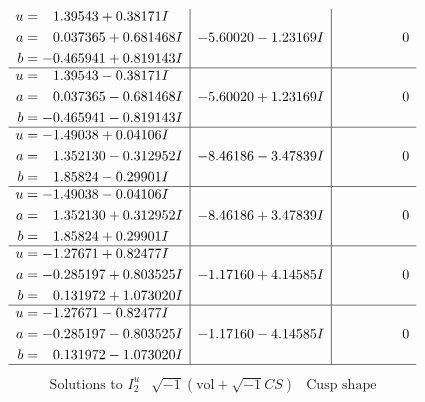 \documentclass[1p]{elsarticle_modified}
\theoremstyle{definition}
\newcommand{\I}{\sqrt{-1}}
\begin{document}
$$\begin{array}{c|c|c}
\begin{aligned}
u &= \phantom{-}1.39543 + 0.38171 I \\
a &= \phantom{-}0.037365 + 0.681468 I \\
b &= -0.465941 + 0.819143 I\end{aligned}
 & -5.60020 - 1.23169 I & \phantom{-0.000000 } 0 \\ \hline\begin{aligned}
u &= \phantom{-}1.39543 - 0.38171 I \\
a &= \phantom{-}0.037365 - 0.681468 I \\
b &= -0.465941 - 0.819143 I\end{aligned}
 & -5.60020 + 1.23169 I & \phantom{-0.000000 } 0 \\ \hline\begin{aligned}
u &= -1.49038 + 0.04106 I \\
a &= \phantom{-}1.352130 - 0.312952 I \\
b &= \phantom{-}1.85824 - 0.29901 I\end{aligned}
 & -8.46186 - 3.47839 I & \phantom{-0.000000 } 0 \\ \hline\begin{aligned}
u &= -1.49038 - 0.04106 I \\
a &= \phantom{-}1.352130 + 0.312952 I \\
b &= \phantom{-}1.85824 + 0.29901 I\end{aligned}
 & -8.46186 + 3.47839 I & \phantom{-0.000000 } 0 \\ \hline\begin{aligned}
u &= -1.27671 + 0.82477 I \\
a &= -0.285197 + 0.803525 I \\
b &= \phantom{-}0.131972 + 1.073020 I\end{aligned}
 & -1.17160 + 4.14585 I & \phantom{-0.000000 } 0 \\ \hline\begin{aligned}
u &= -1.27671 - 0.82477 I \\
a &= -0.285197 - 0.803525 I \\
b &= \phantom{-}0.131972 - 1.073020 I\end{aligned}
 & -1.17160 - 4.14585 I & \phantom{-0.000000 } 0\\
 \hline 
 \end{array}$$\newpage$$\begin{array}{c|c|c}  
\text{Solutions to }I^u_{2}& \I (\text{vol} + \sqrt{-1}CS) & \text{Cusp shape}\\
 \hline 
\begin{aligned}

\end{aligned}
\end{array}$$
\end{document}
